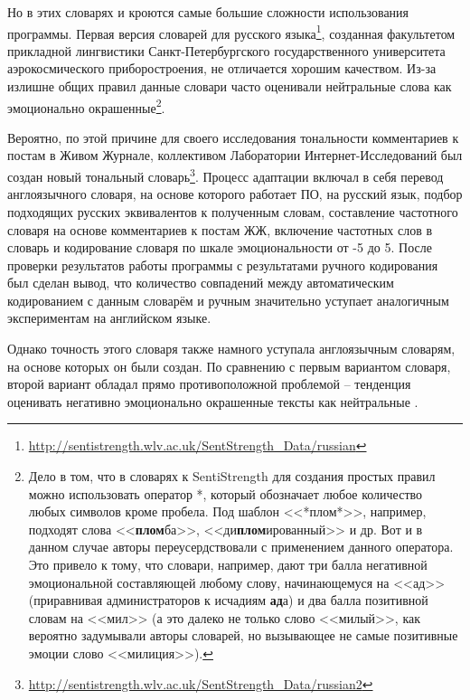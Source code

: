 Но в этих словарях и кроются самые большие сложности использования программы. Первая версия словарей для русского языка\footnote{\href{http://sentistrength.wlv.ac.uk/SentStrength\_Data/russian}{http://sentistrength.wlv.ac.uk/SentStrength\_Data/russian}}, созданная факультетом прикладной лингвистики Санкт-Петербургского государственного университета аэрокосмического приборостроения, не отличается хорошим качеством. Из-за излишне общих правил данные словари часто оценивали нейтральные слова как эмоционально окрашенные\footnote{Дело в том, что в словарях к SentiStrength для создания простых правил можно использовать оператор *, который обозначает любое количество любых символов кроме пробела. Под шаблон <<*плом*>>, например, подходят слова <<\textbf{плом}ба>>, <<ди\textbf{плом}ированный>> и др. Вот и в данном случае авторы переусердствовали с применением данного оператора. Это привело к тому, что словари, например, дают три балла негативной эмоциональной составляющей любому слову, начинающемуся на <<ад>> (приравнивая администраторов к исчадиям \textbf{ад}а) и два балла позитивной словам на <<мил>> (а это далеко не только слово <<милый>>, как вероятно задумывали авторы словарей, но вызывающее не самые позитивные эмоции слово <<милиция>>).}.

Вероятно, по этой причине для своего исследования тональности комментариев к постам в Живом Журнале, коллективом Лаборатории Интернет-Исследований был создан новый тональный словарь\cite{hse_sentistrength}\footnote{\href{http://sentistrength.wlv.ac.uk/SentStrength\_Data/russian2}{http://sentistrength.wlv.ac.uk/SentStrength\_Data/russian2}}. Процесс адаптации включал в себя перевод англоязычного словаря, на основе которого работает ПО, на русский язык, подбор подходящих русских эквивалентов к полученным словам, составление частотного словаря на основе комментариев к постам ЖЖ, включение частотных слов в словарь и кодирование словаря по шкале эмоциональности от -5 до 5. После проверки результатов работы программы с результатами ручного кодирования был сделан вывод, что количество совпадений между автоматическим кодированием с данным словарём и ручным значительно уступает аналогичным экспериментам на английском языке.

Однако точность этого словаря также намного уступала англоязычным словарям, на основе которых он были создан. По сравнению с первым вариантом словаря, второй вариант обладал прямо противоположной проблемой -- тенденция оценивать негативно эмоционально окрашенные тексты как нейтральные \cite[стр. 3]{hse_sentistrength}. 

